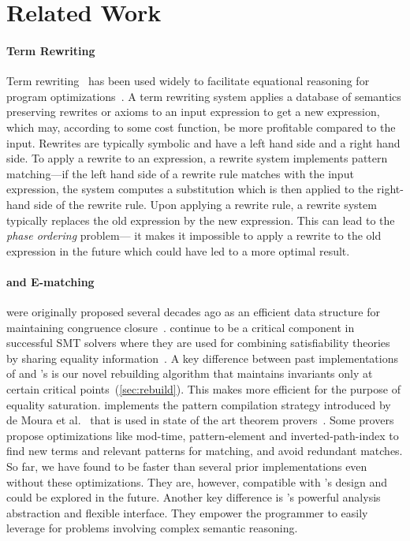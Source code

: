 \section{Related Work}
\label{sec:related}

\paragraph{Term Rewriting}
Term rewriting~\cite{rewritesystems} has been used widely to facilitate
equational reasoning for program
optimizations~\cite{DBLP:conf/scitools/BoyleHW96,
  DBLP:journals/toplas/BrandHKO02, DBLP:conf/icfp/VisserBT98}. A term rewriting
system applies a database of semantics preserving rewrites or axioms to an input
expression to get a new expression, which may, according to some cost function,
be more profitable compared to the input. Rewrites are typically symbolic and
have a left hand side and a right hand side. To apply a rewrite to an
expression, a rewrite system implements pattern matching---if the left hand side
of a rewrite rule matches with the input expression, the system computes a
substitution which is then applied to the right-hand side of the rewrite rule.
Upon applying a rewrite rule, a rewrite system typically replaces the old
expression by the new expression. This can lead to the \textit{phase ordering}
problem--- it makes it impossible to apply a rewrite to the old expression in
the future which could have led to a more optimal result.

\paragraph{\Egraphs and E-matching}
\Egraph were originally proposed several decades ago as an
efficient data structure for maintaining congruence
closure~\cite{nelson-oppen-78, kozen-stoc77, nelson}.
\Egraphs continue to be a critical component in successful SMT
solvers where they are used for combining satisfiability theories by sharing equality
information~\cite{z3}.
 A key difference between past implementations of \egraphs and
  \egg's \egraph is our novel rebuilding algorithm that maintains
  invariants only at certain critical points~(\autoref{sec:rebuild}).
This makes \egg more efficient for the purpose of equality saturation.
  \egg implements the pattern compilation strategy introduced by de Moura et al.~\cite{ematching}
  that is used in state of the art theorem provers~\cite{z3}.
Some provers~\cite{z3, simplify} propose optimizations like mod-time,
pattern-element and inverted-path-index to find new terms and relevant patterns
for matching, and avoid redundant matches. So far, we have found \egg to be
faster than several prior \egraph implementations even without
these optimizations. They are,
however, compatible with \egg's design and could be explored in the future. Another
key difference is \egg's powerful \eclass analysis abstraction and flexible
interface. They empower the programmer to easily leverage \egraphs for problems
involving complex semantic reasoning.

